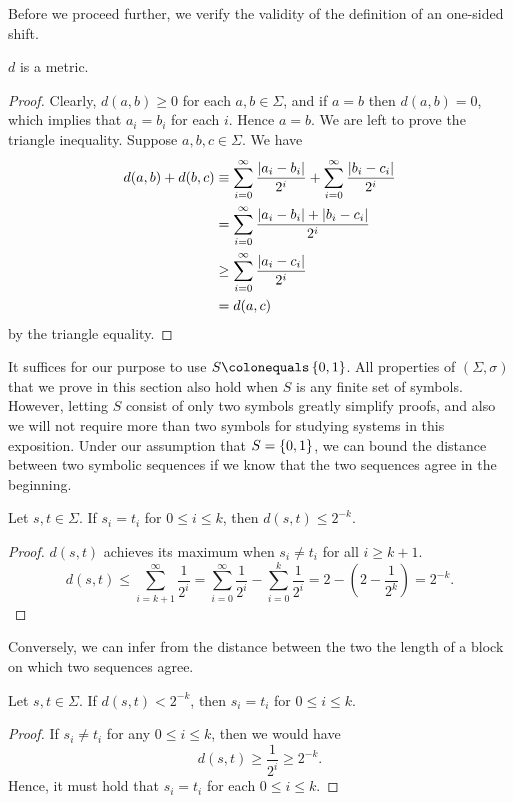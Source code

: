 \documentclass[10pt,twoside]{book}
\begin{document}
Before we proceed further, we verify the validity of the definition of an one-sided shift.
\begin{proposition}
  $d$ is a metric.
  \label{prop:symb-metric}
  \begin{proof}
    Clearly, $d(a,b) \geq 0$ for each $a,b \in \Sigma$, and if $a = b$ then $d(a,b) = 0$, which implies that $a_i = b_i$ for each $i$.
    Hence $a = b$.
    We are left to prove the triangle inequality.
    Suppose $a,b,c \in \Sigma$.
    We have
    \begin{align*}
      d(a,b) + d(b,c)
      &\equiv \sum\limits_{i = 0}^{\infty} \frac{\left | a_i - b_i \right |}{2^i}  +  \sum\limits_{i = 0}^{\infty} \frac{\left | b_i - c_i \right |}{2^i}  \\
      &= \sum\limits_{i = 0}^{\infty} \frac{\left | a_i - b_i \right | + \left | b_i - c_i \right |}{2^i}  \\
      &\geq \sum\limits_{i = 0}^{\infty} \frac{\left | a_i - c_i \right |}{2^i}  \\
      &= d(a,c)
    \end{align*}
    by the triangle equality.
  \end{proof}
\end{proposition}
It suffices for our purpose to use $S \ceq \set{0,1}$.
All properties of $(\Sigma, \sigma)$ that we prove in this section also hold when $S$ is any finite set of symbols.
However, letting $S$ consist of only two symbols greatly simplify proofs, and also we will not require more than two symbols for studying systems in this exposition.
Under our assumption that $S = \left \{ 0,1 \right \}$, we can bound the distance between two symbolic sequences if we know that the two sequences agree in the beginning.
\begin{proposition}
  Let $s, t \in \Sigma$.
  If $s_i = t_i$ for $0 \leq i \leq k$, then $d(s,t) \leq 2^{-k}$.
  \label{prop:symbol-bound1}
  \begin{proof}
    $d(s,t)$ achieves its maximum when $s_i \neq t_i$ for all $i \geq k+1$.
    \begin{equation*}
      d(s,t) 
      \leq \sum\limits_{i = k+1}^{\infty} \frac{1}{2^i}
      = \sum\limits_{i = 0}^{\infty} \frac{1}{2^i} - \sum\limits_{i = 0}^{k} \frac{1}{2^i}
      = 2 - (2 - \frac{1}{2^{k}})
      = 2^{-k}.
    \end{equation*}
  \end{proof}
\end{proposition}
Conversely, we can infer from the distance between the two the length of a block on which two sequences agree.
\begin{proposition}
  Let $s, t \in \Sigma$.
  If $d(s,t) < 2^{-k}$, then $s_i = t_i$ for $0 \leq i \leq k$.
  \label{prop:symbol-bound2}
  \begin{proof}
    If $s_i \neq t_i$ for any $0 \leq i \leq k$, then we would have
    \begin{equation*}
      d(s,t) \geq \frac{1}{2^i} \geq 2^{-k}.
    \end{equation*}
    Hence, it must hold that $s_i = t_i$ for each $0 \leq i \leq k$.
  \end{proof}
\end{proposition}
\end{document}
